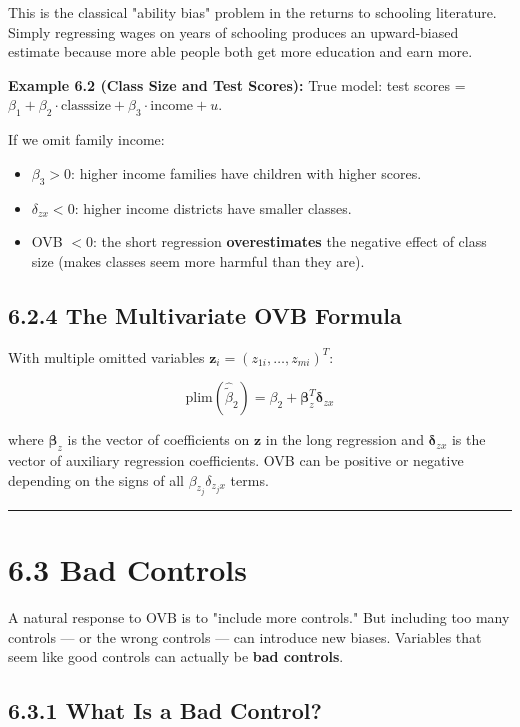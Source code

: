 This is the classical "ability bias" problem in the returns to schooling literature. Simply regressing wages on years of schooling produces an upward-biased estimate because more able people both get more education and earn more.

\textbf{Example 6.2 (Class Size and Test Scores):} True model: test scores = $\beta_1 + \beta_2 \cdot \text{classsize} + \beta_3 \cdot \text{income} + u$.

If we omit family income:
\begin{itemize}
\item $\beta_3 > 0$: higher income families have children with higher scores.
\item $\delta_{zx} < 0$: higher income districts have smaller classes.
\item OVB $< 0$: the short regression \textbf{overestimates} the negative effect of class size (makes classes seem more harmful than they are).
\end{itemize}

\subsection{6.2.4 The Multivariate OVB Formula}

With multiple omitted variables $\mathbf{z}_i = (z_{1i}, \ldots, z_{mi})^T$:

\[
\text{plim}(\hat{\tilde{\beta}}_2) = \beta_2 + \boldsymbol{\beta}_z^T \boldsymbol{\delta}_{zx}
\]

where $\boldsymbol{\beta}_z$ is the vector of coefficients on $\mathbf{z}$ in the long regression and $\boldsymbol{\delta}_{zx}$ is the vector of auxiliary regression coefficients. OVB can be positive or negative depending on the signs of all $\beta_{z_j} \delta_{z_j x}$ terms.

\medskip\hrule\medskip

\section{6.3 Bad Controls}

A natural response to OVB is to "include more controls." But including too many controls --- or the wrong controls --- can introduce new biases. Variables that seem like good controls can actually be \textbf{bad controls}.

\subsection{6.3.1 What Is a Bad Control?}


